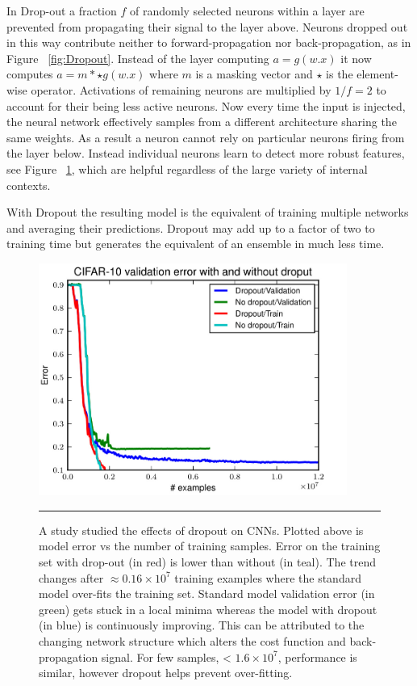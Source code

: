 In Drop-out a fraction $f$ of randomly selected neurons within a layer are prevented from propagating their signal to the layer above.
Neurons dropped out in this way contribute neither to forward-propagation nor back-propagation, as in Figure ~\ref{fig:Dropout}.
Instead of the layer computing $a=g(w.x)$ it now computes $a=m*\star g(w.x)$ where $m$ is a masking vector and $\star$ is the element-wise operator.
Activations of remaining neurons are multiplied by $1/f = 2$ to account for their being less active neurons\citep{goyal2014object}.
Now every time the input is injected, the neural network effectively samples from a different architecture sharing the same weights\citep{krizhevsky2012imagenet}.
As a result a neuron cannot rely on particular neurons firing from the layer below.
Instead individual neurons learn to detect more robust features, see Figure ~\ref{fig:Dropout_training}, which are helpful regardless of the large variety of internal contexts.

With Dropout the resulting model is the equivalent of training multiple networks and averaging their predictions.
Dropout may add up to a factor of two to training time but generates the equivalent of an ensemble in much less time\citep{krizhevsky2012imagenet}.

\begin{figure}[htbp]
	\centering
		\includegraphics[width = 0.9\textwidth]{./Figures/training_with_dropout.jpg} %
		\rule{35em}{0.5pt}
	\caption[Drop-out Training]{A study\citep{wu2015towards} studied the effects of dropout on CNNs. Plotted above is model error vs the number of training samples. Error on the training set with drop-out (in red) is lower than without (in teal). The trend changes after $\approx 0.16\times 10^7$ training examples where the standard model over-fits the training set. Standard model validation error (in green) gets stuck in a local minima whereas the model with dropout (in blue) is continuously improving. This can be attributed to the changing network structure which alters the cost function and back-propagation signal. For few samples, < $1.6 \times 10^7$, performance is similar, however dropout helps prevent over-fitting.}
	\label{fig:Dropout_training}
\end{figure}

